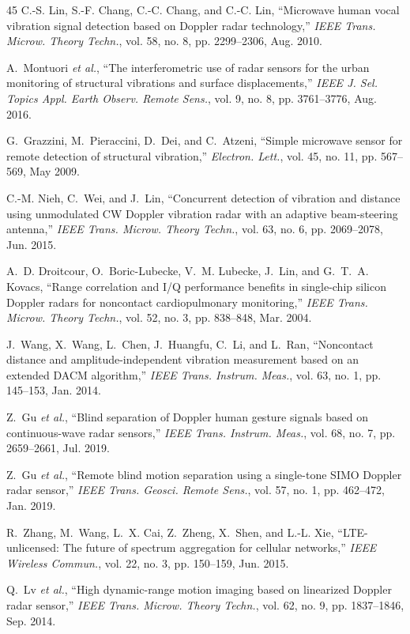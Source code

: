 \begin{TranslationNoMiniToc}
\begin{thebibliography}{45}
C.-S. Lin, S.-F. Chang, C.-C. Chang, and C.-C. Lin, ``Microwave human vocal vibration signal detection based on Doppler radar technology,'' \emph{IEEE Trans. Microw. Theory Techn.}, vol. 58, no. 8, pp. 2299--2306, Aug. 2010.

A.~Montuori \emph{et al.}, ``The interferometric use of radar sensors for the urban monitoring of structural vibrations and surface displacements,'' \emph{IEEE J. Sel. Topics Appl. Earth Observ. Remote Sens.}, vol. 9, no. 8, pp. 3761--3776, Aug. 2016.

G.~Grazzini, M.~Pieraccini, D.~Dei, and C.~Atzeni, ``Simple microwave sensor for remote detection of structural vibration,'' \emph{Electron. Lett.}, vol. 45, no. 11, pp. 567--569, May 2009.

C.-M. Nieh, C.~Wei, and J.~Lin, ``Concurrent detection of vibration and distance using unmodulated CW Doppler vibration radar with an adaptive beam-steering antenna,'' \emph{IEEE Trans. Microw. Theory Techn.}, vol. 63, no. 6, pp. 2069--2078, Jun. 2015.

A.~D. Droitcour, O.~Boric-Lubecke, V.~M. Lubecke, J.~Lin, and G.~T.~A. Kovacs, ``Range correlation and I/Q performance benefits in single-chip silicon Doppler radars for noncontact cardiopulmonary monitoring,'' \emph{IEEE Trans. Microw. Theory Techn.}, vol. 52, no. 3, pp. 838--848, Mar. 2004.

J.~Wang, X.~Wang, L.~Chen, J.~Huangfu, C.~Li, and L.~Ran, ``Noncontact distance and amplitude-independent vibration measurement based on an extended DACM algorithm,'' \emph{IEEE Trans. Instrum. Meas.}, vol. 63, no. 1, pp. 145--153, Jan. 2014.

Z.~Gu \emph{et al.}, ``Blind separation of Doppler human gesture signals based on continuous-wave radar sensors,'' \emph{IEEE Trans. Instrum. Meas.}, vol. 68, no. 7, pp. 2659--2661, Jul. 2019.

Z.~Gu \emph{et al.}, ``Remote blind motion separation using a single-tone SIMO Doppler radar sensor,'' \emph{IEEE Trans. Geosci. Remote Sens.}, vol. 57, no. 1, pp. 462--472, Jan. 2019.

R.~Zhang, M.~Wang, L.~X. Cai, Z.~Zheng, X.~Shen, and L.-L. Xie, ``LTE-unlicensed: The future of spectrum aggregation for cellular networks,'' \emph{IEEE Wireless Commun.}, vol. 22, no. 3, pp. 150--159, Jun. 2015.

Q.~Lv \emph{et al.}, ``High dynamic-range motion imaging based on linearized Doppler radar sensor,'' \emph{IEEE Trans. Microw. Theory Techn.}, vol. 62, no. 9, pp. 1837--1846, Sep. 2014.


\end{thebibliography}
\end{TranslationNoMiniToc}
